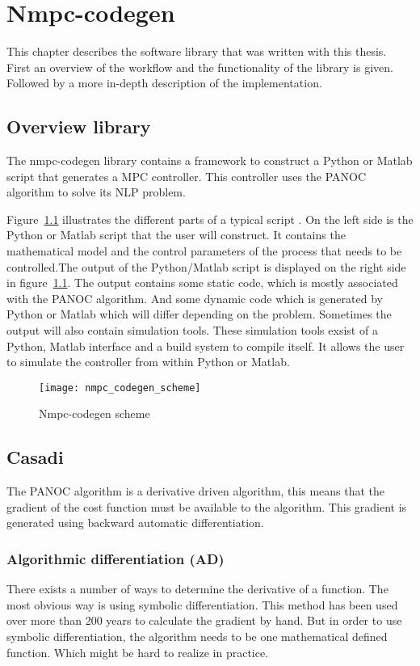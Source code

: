 \chapter{Nmpc-codegen}
This chapter describes the software library that was written with this thesis. First an overview of the workflow and the functionality of the library is given. Followed by a more in-depth description of the implementation.
\section{Overview library}
The nmpc-codegen library contains a framework to construct a Python or Matlab script that generates a MPC controller. This controller uses the PANOC algorithm to solve its NLP problem.

Figure~\ref{fig:nmpc-codegen scheme} illustrates the different parts of a typical script . On the left side is the Python or Matlab script that the user will construct. It contains the mathematical model and the control parameters of the process that needs to be controlled.The output of the Python/Matlab script is displayed on the right side in figure~\ref{fig:nmpc-codegen scheme}. The output contains some static code, which is mostly associated with the PANOC algorithm. And some dynamic code which is generated by Python or Matlab which will differ depending on the problem. Sometimes the output will also contain simulation tools. These simulation tools exsist of a Python, Matlab interface and a build system to compile itself. It allows the user to simulate the controller from within Python or Matlab.
	\begin{figure}[H]
		\centering
		\texttt{[image: nmpc\_codegen\_scheme]}
		\caption{Nmpc-codegen scheme}
		\label{fig:nmpc-codegen scheme}
	\end{figure}

\section{Casadi}
The PANOC algorithm is a derivative driven algorithm, this means that the gradient of the cost function must be available to the algorithm. This gradient is generated using backward automatic differentiation.

\subsection{Algorithmic differentiation (AD)}
There exists a number of ways to determine the derivative of a function. The most obvious way is using symbolic differentiation. This method has been used over more than 200 years to calculate the gradient by hand. But in order to use symbolic differentiation, the algorithm needs to be one mathematical defined function. Which might be hard to realize in practice.

